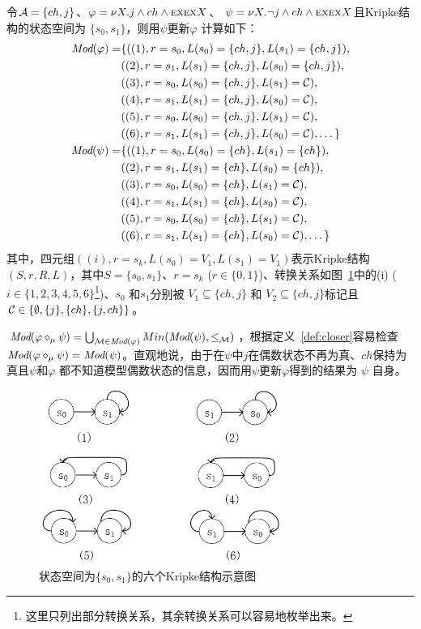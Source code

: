 \begin{example}
	令${\cal A}=\{ch, j\}$、$\varphi = \nu X. j \wedge ch \wedge \textsc{e} \textsc{x} \textsc{e} \textsc{x} X$、 $\psi= \nu X. \neg j \wedge ch \wedge \textsc{e} \textsc{x} \textsc{e} \textsc{x} X$且Kripke结构的状态空间为 $\{s_0,s_1\}$，则用$\psi$更新$\varphi$ 计算如下：
	\begin{align*}
		\textit{Mod}(\varphi) = & \{((1), r=s_0, L(s_0)=\{ch,j\}, L(s_1)=\{ch,j\}), \\
		& ((2),  r=s_1, L(s_1)=\{ch,j\}, L(s_0)=\{ch,j\}),\\
		& ((3),  r=s_0, L(s_0)=\{ch,j\}, L(s_1)={\cal C}), \\
		& ((4),  r=s_1, L(s_1)=\{ch,j\}, L(s_0)={\cal C}), \\
		& ((5),  r=s_0, L(s_0)=\{ch,j\}, L(s_1)={\cal C}), \\
		& ((6),  r=s_1, L(s_1)=\{ch,j\}, L(s_0)={\cal C}), \dots\}\\
		\textit{Mod}(\psi) = & \{((1), r=s_0, L(s_0)=\{ch\}, L(s_1)=\{ch\}),\\
		& ((2), r=s_1, L(s_1)=\{ch\}, L(s_0)=\{ch\}),\\
		& ((3), r=s_0, L(s_0)=\{ch\}, L(s_1)={\cal C}),\\
		& ((4), r=s_1, L(s_1)=\{ch\}, L(s_0)={\cal C}), \\
		& ((5), r=s_0, L(s_0)=\{ch\}, L(s_1)={\cal C}),\\
		& ((6), r=s_1, L(s_1)=\{ch\}, L(s_0)={\cal C}), \dots\}
	\end{align*}
	其中，四元组$((i), r= s_k, L(s_0)=V_1, L(s_1)=V_1)$表示Kripke结构$(S,r,R,L)$，其中$S=\{s_0, s_1\}$、$r=s_k$ ($r\in \{0,1\}$)、转换关系如图~\ref{fig:knoup}中的(i) ($i \in \{1,2,3,4,5,6\}$\footnote{这里只列出部分转换关系，其余转换关系可以容易地枚举出来。})、$s_0$ 和$s_1$分别被 $V_1 \subseteq \{ch,j\}$ 和 $V_2\subseteq \{ch,j\}$标记且${\cal C} \in \{\emptyset, \{j\}, \{ch\}, \{j,ch\}\}$。
	
	$\textit{Mod}(\varphi \diamond_{\mu} \psi) = \bigcup_{{\cal M}\in \textit{Mod}(\varphi)} Min(\textit{Mod}(\psi), \leq_{{\cal M}})$，根据定义~\ref{def:closer}容易检查$\textit{Mod}(\varphi \diamond_{\mu} \psi) = \textit{Mod}(\psi)$。直观地说，由于在$\psi$中$j$在偶数状态不再为真、$ch$保持为真且$\psi$和$\varphi$ 都不知道模型偶数状态的信息，因而用$\psi$更新$\varphi$得到的结果为 $\psi$ 自身。
	\begin{figure}[h]%
		\centering
		\includegraphics[width=8cm]{knowledge_update.png}
		\caption{状态空间为$\{s_0,s_1\}$的六个Kripke结构示意图}\label{fig:knoup}
		
	\end{figure}
\end{example}


